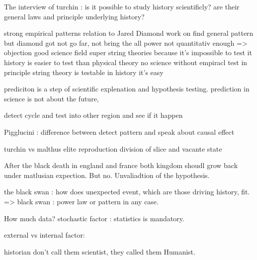 

The interview of turchin : 
	is it possible to study history scientificly?
	are their general laws and principle underlying history?

	strong empirical patterns relation to Jared Diamond work on find general pattern
but diamond got not go far, not bring the all power not quantitativ enough
=> objection good science field super string theories because it's impossible to test it
	history is easier to test than physical theory
	no science without empiracl test
	in principle string theory is testable
	in history it's easy
					
prediciton is a step of scientific explenation and hypothesis testing.
prediction in science is not about the future,

detect cycle and test into other region and see if it happen

Pigglucini : difference between detect pattern and speak about causal effect

turchin vs malthus
elite reproduction division of slice and vacante state


After the black death in england and france both kingdom shoudl grow back under matlusian expection. But no. Unvaliadtion of the hypothesis.

the black swan : how does unexpected event, which are those driving history, fit. => black swan : power law or pattern in any case.

How much data? stochastic factor : statistics is mandatory.

external vs internal factor:


historian don't call them scientist, they called them Humanist.


